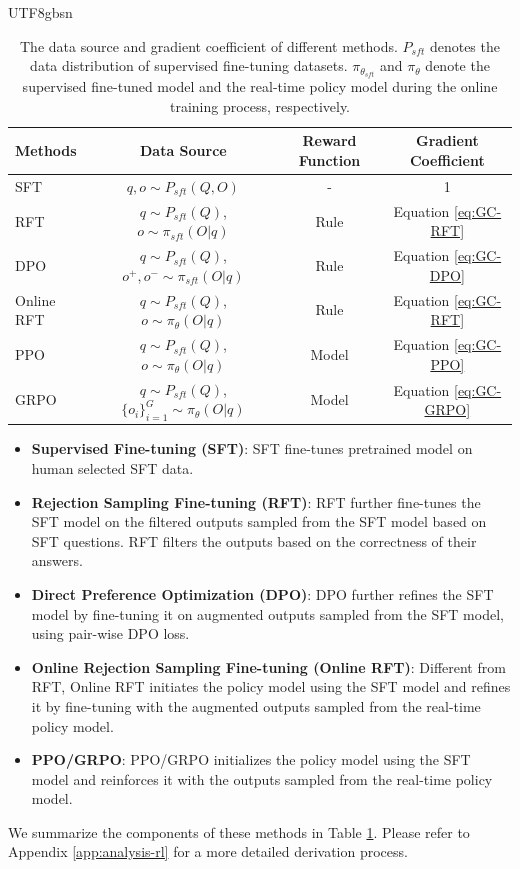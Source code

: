 \documentclass[11pt, a4paper, logo, copyright, nonumbering]{deepseek}
\begin{document}
\begin{CJK*}{UTF8}{gbsn}
\begin{table}[t]
    \centering
    \begin{small}
    \begin{tabular}{lccc}
    \toprule
     \textbf{Methods} & \textbf{Data Source}  & \textbf{Reward Function} & \textbf{Gradient Coefficient}  \\
    \midrule
    SFT & $q, o \sim P_{sft}(Q, O)$& - &  1 \\
    \midrule
    RFT  & $q \sim P_{sft}(Q)$, $o \sim \pi_{sft}(O|q)$ & Rule & Equation \ref{eq:GC-RFT} \\
     DPO & $q \sim P_{sft}(Q)$, $o^+, o^- \sim \pi_{sft}(O|q)$ & Rule & Equation \ref{eq:GC-DPO} \\
    \midrule
    Online RFT  & $q \sim P_{sft}(Q)$, $o \sim \pi_{\theta}(O|q)$ & Rule & Equation \ref{eq:GC-RFT} \\
    PPO & $q \sim P_{sft}(Q)$, $o \sim \pi_{\theta}(O|q)$ & Model & Equation \ref{eq:GC-PPO} \\
    GRPO & $q \sim P_{sft}(Q)$, $\{o_i\}_{i=1}^G \sim \pi_{\theta}(O|q)$ & Model & Equation \ref{eq:GC-GRPO} \\
    \bottomrule
    \end{tabular}
    \end{small}
    \caption{The data source and gradient coefficient of different methods. $P_{sft}$ denotes the data distribution of supervised fine-tuning datasets. $\pi_{\theta_{sft}}$ and $\pi_{\theta}$ denote the supervised fine-tuned model and the real-time policy model during the online training process, respectively.}
    \label{tab:data_policy}
\end{table}

\begin{itemize}
    \item  \textbf{Supervised Fine-tuning (SFT)}: SFT fine-tunes pretrained model on human selected SFT data.
    \item \textbf{Rejection Sampling Fine-tuning (RFT)}: RFT further fine-tunes the SFT model on the filtered outputs sampled from the SFT model based on SFT questions. RFT filters the outputs based on the correctness of their answers.
    \item \textbf{Direct Preference Optimization (DPO)}: DPO further refines the SFT model by fine-tuning it on augmented outputs sampled from the SFT model, using pair-wise DPO loss.
    \item \textbf{Online Rejection Sampling Fine-tuning (Online RFT)}: Different from RFT, Online RFT initiates the policy model using the SFT model and refines it by fine-tuning with the augmented outputs sampled from the real-time policy model.
    \item \textbf{PPO/GRPO}: PPO/GRPO initializes the policy model using the SFT model and reinforces it with the outputs sampled from the real-time policy model.
\end{itemize}
We summarize the components of these methods in Table \ref{tab:data_policy}.
Please refer to Appendix \ref{app:analysis-rl} for a more detailed derivation process.


\end{CJK*}
\end{document}
